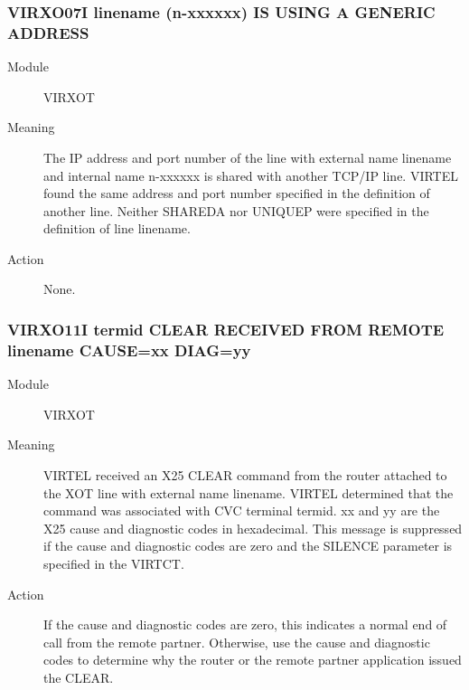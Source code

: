 \documentclass[letterpaper,10pt,english]{sphinxmanual}
\begin{document}
\subsubsection{VIRXO07I linename (n-xxxxxx) IS USING A GENERIC ADDRESS}
\label{\detokenize{messages:virxo07i-linename-n-xxxxxx-is-using-a-generic-address}}\begin{description}
\item[{Module}] \leavevmode
VIRXOT

\item[{Meaning}] \leavevmode
The IP address and port number of the line with external name linename and internal name n-xxxxxx is shared with another TCP/IP line. VIRTEL found the same address and port number specified in the definition of another line. Neither SHAREDA nor UNIQUEP were specified in the definition of line linename.

\item[{Action}] \leavevmode
None.

\end{description}


\subsubsection{VIRXO11I termid CLEAR RECEIVED FROM REMOTE linename CAUSE=xx DIAG=yy}
\label{\detokenize{messages:virxo11i-termid-clear-received-from-remote-linename-cause-xx-diag-yy}}\begin{description}
\item[{Module}] \leavevmode
VIRXOT

\item[{Meaning}] \leavevmode
VIRTEL received an X25 CLEAR command from the router attached to the XOT line with external name linename. VIRTEL determined that the command was associated with CVC terminal termid. xx and yy are the X25 cause and diagnostic codes in hexadecimal. This message is suppressed if the cause and diagnostic codes are zero and the SILENCE parameter is specified in the VIRTCT.

\item[{Action}] \leavevmode
If the cause and diagnostic codes are zero, this indicates a normal end of call from the remote partner. Otherwise, use the cause and diagnostic codes to determine why the router or the remote partner application issued the CLEAR.

\end{description}
\end{document}
